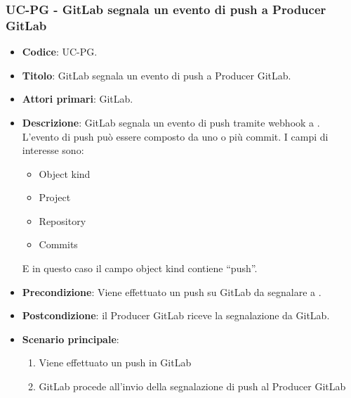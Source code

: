 \subsubsection{UC\theuccount-PG - GitLab segnala un evento di push a Producer GitLab}
\begin{itemize}
    \item \textbf{Codice}: UC\theuccount-PG.
    \item \textbf{Titolo}: GitLab segnala un evento di push a Producer GitLab.
    \item \textbf{Attori primari}: GitLab.
    \item \textbf{Descrizione}: GitLab segnala un evento di push tramite webhook a \progetto. L'evento di	push può essere composto da uno o più commit.
    I campi di interesse sono:
    \begin{itemize}
        \item Object kind
        \item Project
        \item Repository
        \item Commits
    \end{itemize}
    E in questo caso il campo object kind contiene ``push''.
    \item \textbf{Precondizione}: Viene effettuato un push su GitLab da segnalare a \progetto.
    \item \textbf{Postcondizione}: il Producer GitLab riceve la segnalazione da GitLab.
    \item \textbf{Scenario principale}: 
    \begin{enumerate}
        \item Viene effettuato un push in GitLab
        \item GitLab procede all'invio della segnalazione di push al Producer GitLab
    \end{enumerate}
    
\end{itemize}